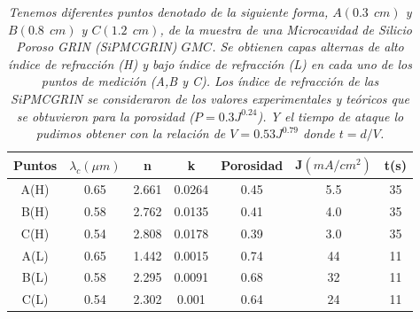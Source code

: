 \documentclass[a4paper,11pt,]{book}
\begin{document}
\begin{table}[H]
	\centering
	\begin{tabular}{|c|c|c|c|c|c|c|}
		\hline 
		\textbf{Puntos} & $\lambda_c (\mu m)$ & \textbf{n} & \textbf{k} & \textbf{Porosidad} & \textbf{J}$(mA/cm^2)$ & \textbf{t(s)}\\ 
		\hline 
		A(H) & 0.65 & 2.661 & 0.0264 & 0.45 & 5.5 & 35 \\ 
		\hline 
		B(H) & 0.58 & 2.762 & 0.0135 & 0.41 & 4.0 & 35 \\ 
		\hline 
		C(H) & 0.54 & 2.808 & 0.0178 & 0.39 & 3.0 & 35 \\ 
		\hline 
		A(L) & 0.65 & 1.442 & 0.0015 & 0.74 & 44 & 11 \\ 
		\hline 
		B(L) & 0.58 & 2.295 & 0.0091 & 0.68 & 32 & 11 \\ 
		\hline 
		C(L) & 0.54 & 2.302 & 0.001 & 0.64 & 24 & 11 \\ 
		\hline 
	\end{tabular} 
	\caption{ \emph{Tenemos  diferentes puntos denotado de la siguiente forma,  $A(0.3\ \ cm)$ y $ B(0.8 \ \  cm)$ y $ C(1.2 \ \  cm)$, de la  muestra de una Microcavidad de Silicio Poroso GRIN (SiPMCGRIN) $GMC$. Se obtienen capas alternas de alto índice de refracción (H) y bajo índice de refracción (L) en cada uno de los puntos de medición (A,B y C). Los índice de refracción de las SiPMCGRIN se consideraron de los valores experimentales y teóricos que se obtuvieron para la porosidad ($P=0.3J^{0.24}$). Y el tiempo de ataque lo pudimos obtener con la relación de $V=0.53J^{0.79}$ donde $t=d/V$.}}
	\label{tabla:1}
\end{table}
\end{document}
